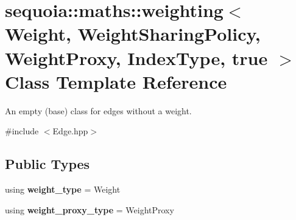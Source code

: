 \hypertarget{classsequoia_1_1maths_1_1weighting_3_01_weight_00_01_weight_sharing_policy_00_01_weight_proxy_00_01_index_type_00_01true_01_4}{}\section{sequoia\+::maths\+::weighting$<$ Weight, Weight\+Sharing\+Policy, Weight\+Proxy, Index\+Type, true $>$ Class Template Reference}
\label{classsequoia_1_1maths_1_1weighting_3_01_weight_00_01_weight_sharing_policy_00_01_weight_proxy_00_01_index_type_00_01true_01_4}


An empty (base) class for edges without a weight.  




{\ttfamily \#include $<$Edge.\+hpp$>$}

\subsection*{Public Types}
\begin{DoxyCompactItemize}
\item 
\mbox{\label{classsequoia_1_1maths_1_1weighting_3_01_weight_00_01_weight_sharing_policy_00_01_weight_proxy_00_01_index_type_00_01true_01_4_a57262320111c9cec3b906481aaf51b17}} 
using {\bfseries weight\+\_\+type} = Weight
\item 
\mbox{\label{classsequoia_1_1maths_1_1weighting_3_01_weight_00_01_weight_sharing_policy_00_01_weight_proxy_00_01_index_type_00_01true_01_4_a2172c18047638efbfa431597f48c10b4}} 
using {\bfseries weight\+\_\+proxy\+\_\+type} = Weight\+Proxy
\end{DoxyCompactItemize}
